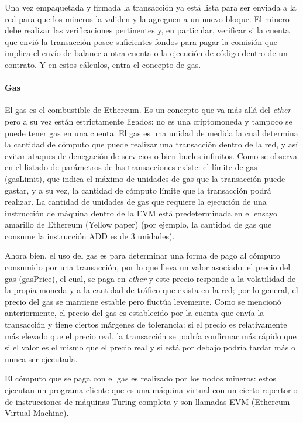 Una vez empaquetada y firmada la transacción ya está lista para ser enviada a la red para que los mineros la validen y la agreguen a un nuevo bloque. El minero debe realizar las verificaciones pertinentes y, en particular, verificar si la cuenta que envió la transacción posee suficientes fondos para pagar la comisión que implica el envío de balance a otra cuenta o la ejecución de código dentro de un contrato. Y en estos cálculos, entra el concepto de gas.

\paragraph{Gas}
\label{bc_ethereum_gas}

El gas es el combustible de Ethereum. Es un concepto que va más allá del \textit{ether} pero a su vez están estrictamente ligados: no es una criptomoneda y tampoco se puede tener gas en una cuenta. El gas es una unidad de medida la cual determina la cantidad de cómputo que puede realizar una transacción dentro de la red, y así evitar ataques de denegación de servicios o bien bucles infinitos. Como se observa en el listado de parámetros de las transacciones existe: el límite de gas (gasLimit), que indica el máximo de unidades de gas que la transacción puede gastar, y a su vez, la cantidad de cómputo límite que la transacción podrá realizar. La cantidad de unidades de gas que requiere la ejecución de una instrucción de máquina dentro de la EVM está predeterminada en el ensayo amarillo de Ethereum (Yellow paper)\cite{wood2014ethereum} (por ejemplo, la cantidad de gas que consume la instrucción ADD es de 3 unidades).

Ahora bien, el uso del gas es para determinar una forma de pago al cómputo consumido por una transacción, por lo que lleva un valor asociado: el precio del gas (gasPrice), el cual, se paga en \textit{ether} y este precio responde a la volatilidad de la propia moneda y a la cantidad de tráfico que exista en la red; por lo general, el precio del gas se mantiene estable pero fluctúa levemente. Como se mencionó anteriormente, el precio del gas es establecido por la cuenta que envía la transacción y tiene ciertos márgenes de tolerancia: si el precio es relativamente más elevado que el precio real, la transacción se podría confirmar más rápido que si el valor es el mismo que el precio real y si está por debajo podría tardar más o nunca ser ejecutada.

El cómputo que se paga con el gas es realizado por los nodos mineros: estos ejecutan un programa cliente que es una máquina virtual con un cierto repertorio de instrucciones de máquinas Turing completa y son llamadas EVM (Ethereum Virtual Machine).

